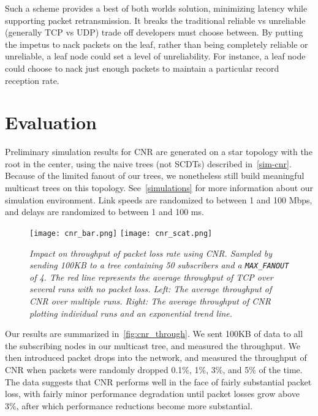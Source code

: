 Such a scheme provides a best of both worlds solution, minimizing latency while
supporting packet retransmission.  It breaks the
traditional reliable vs unreliable (generally TCP vs UDP) trade off developers
must choose between.  By putting the impetus to nack packets on the leaf, rather
than being completely reliable or unreliable, a leaf node could set a level of
unreliability.  For instance, a leaf node could choose to nack just enough
packets to maintain a particular record reception rate.


\section{Evaluation}
\label{cnr-eval}
Preliminary simulation results for CNR are generated on a star topology with the root in the center, using the naive trees (not SCDTs) described in~\autoref{sim-cnr}. Because of the limited fanout  of our trees, we nonetheless still build meaningful multicast trees on this topology.  See~\autoref{simulations} for more information about our simulation environment.  Link speeds are randomized to between 1 and 100 Mbps, and delays are randomized to between 1 and 100 ms.

\begin{figure}[h]
	\begin{center}
		\texttt{[image: cnr\_bar.png]}
		\texttt{[image: cnr\_scat.png]}
	\end{center}
	\vspace{-1.3em}
	\caption{\small \itshape Impact on throughput of packet loss rate using CNR. Sampled by sending 100KB to a tree containing 50 subscribers and a \texttt{MAX\_FANOUT} of 4. The red line represents the average throughput of TCP over several runs with no packet loss.  Left: The average throughput of CNR over multiple runs. Right: The average throughput of CNR plotting individual runs and an exponential trend line.}
	\vspace{-1em}
	\label{fig:cnr_through}
\end{figure}

Our results are summarized in~\autoref{fig:cnr_through}. We sent 100KB of data to all the subscribing nodes in our multicast tree, and measured the throughput. We then introduced packet drops into the network, and measured the throughput of CNR when packets were randomly dropped 0.1\%, 1\%, 3\%, and 5\% of the time. The data suggests that CNR performs well in the face of fairly substantial packet loss, with fairly minor performance degradation until packet losses grow above 3\%, after which performance reductions become more substantial. 

